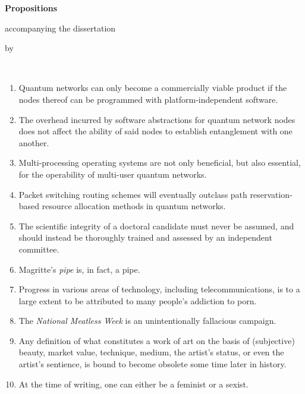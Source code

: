 \begin{center}

{\Large\titlefont\bfseries Propositions}

\medskip

accompanying the dissertation

\medskip

{\makeatletter
\titlestyle\bfseries\large\@title
\makeatother}

{\makeatletter
\ifx\@subtitle\undefined\else
\titlefont\titleshape\@subtitle
\fi
\makeatother}

\medskip

by

\medskip

\makeatletter
{\large\titlefont\bfseries\@firstname\ {\titleshape\@lastname}}
\makeatother

\end{center}

\bigskip

\begin{enumerate}
    \item Quantum networks can only become a commercially viable product if the nodes thereof can be
          programmed with platform-independent software.
    \item The overhead incurred by software abstractions for quantum network nodes does not affect
          the ability of said nodes to establish entanglement with one another.
    \item Multi-processing operating systems are not only beneficial, but also essential, for the
          operability of multi-user quantum networks.
    \item Packet switching routing schemes will eventually outclass path reservation-based resource
          allocation methods in quantum networks.
    \item The scientific integrity of a doctoral candidate must never be assumed, and should
          instead be thoroughly trained and assessed by an independent committee.
    \item Magritte's \emph{pipe} is, in fact, a pipe.
    \item Progress in various areas of technology, including telecommunications, is to a large
          extent to be attributed to many people's addiction to porn.
    \item The \emph{National Meatless Week} is an unintentionally fallacious campaign.
    \item Any definition of what constitutes a work of art on the basis of (subjective) beauty,
          market value, technique, medium, the artist's status, or even the artist's sentience, is
          bound to become obsolete some time later in history.
    \item At the time of writing, one can either be a feminist or a sexist.
\end{enumerate}

